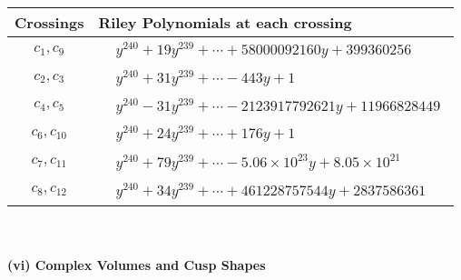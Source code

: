 \documentclass[1p]{elsarticle_modified}
\theoremstyle{definition}
\begin{document}
\begin{tabular}{m{50pt}|m{274pt}}
Crossings & \hspace{64pt}Riley Polynomials at each crossing \\
\hline $$\begin{aligned}c_{1},c_{9}\end{aligned}$$&$\begin{aligned}
&y^{240}+19 y^{239}+\cdots+58000092160 y+399360256
\end{aligned}$\\
\hline $$\begin{aligned}c_{2},c_{3}\end{aligned}$$&$\begin{aligned}
&y^{240}+31 y^{239}+\cdots-443 y+1
\end{aligned}$\\
\hline $$\begin{aligned}c_{4},c_{5}\end{aligned}$$&$\begin{aligned}
&y^{240}-31 y^{239}+\cdots-2123917792621 y+11966828449
\end{aligned}$\\
\hline $$\begin{aligned}c_{6},c_{10}\end{aligned}$$&$\begin{aligned}
&y^{240}+24 y^{239}+\cdots+176 y+1
\end{aligned}$\\
\hline $$\begin{aligned}c_{7},c_{11}\end{aligned}$$&$\begin{aligned}
&y^{240}+79 y^{239}+\cdots-5.06\times10^{23} y+8.05\times10^{21}
\end{aligned}$\\
\hline $$\begin{aligned}c_{8},c_{12}\end{aligned}$$&$\begin{aligned}
&y^{240}+34 y^{239}+\cdots+461228757544 y+2837586361
\end{aligned}$\\
\hline
\end{tabular}\\~\\
\newpage\flushleft \textbf{(vi) Complex Volumes and Cusp Shapes}
\end{document}
